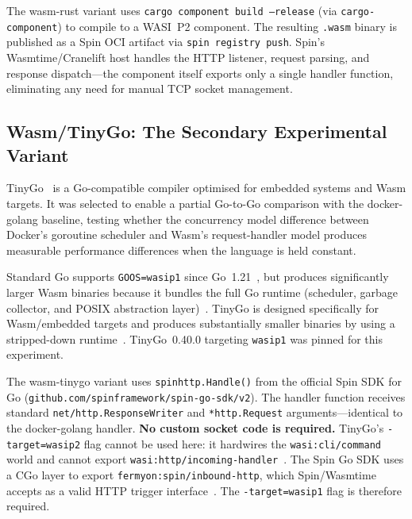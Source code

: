 \begin{sloppypar}
The wasm-rust variant uses \texttt{cargo component build --release} (via \texttt{cargo-component}) to compile to a \acs{WASI}~P2 component. The resulting \texttt{.wasm} binary is published as a Spin \acs{OCI} artifact via \texttt{spin registry push}. Spin's Wasmtime/Cranelift host handles the \acs{HTTP} listener, request parsing, and response dispatch---the component itself exports only a single handler function, eliminating any need for manual \acs{TCP} socket management.
\end{sloppypar}

\subsection{Wasm/TinyGo: The Secondary Experimental Variant}

TinyGo~\cite{tinygo2024} is a Go-compatible compiler optimised for embedded systems and \acs{Wasm} targets. It was selected to enable a partial Go-to-Go comparison with the docker-golang baseline, testing whether the concurrency model difference between Docker's goroutine scheduler and \acs{Wasm}'s request-handler model produces measurable performance differences when the language is held constant.

\begin{sloppypar}
Standard Go supports \texttt{GOOS=wasip1} since Go~1.21~\cite{goblogwasi2024}, but produces significantly larger \acs{Wasm} binaries because it bundles the full Go runtime (scheduler, garbage collector, and \acs{POSIX} abstraction layer)~\cite{goblogwasi2024}. TinyGo is designed specifically for \acs{Wasm}/embedded targets and produces substantially smaller binaries by using a stripped-down runtime~\cite{tinygo2024}. TinyGo~0.40.0 targeting \texttt{wasip1} was pinned for this experiment.
\end{sloppypar}

\begin{sloppypar}
The wasm-tinygo variant uses \texttt{spinhttp.Handle()} from the official Spin \acs{SDK} for Go (\texttt{github.com/spinframework/spin-go-sdk/v2}). The handler function receives standard \texttt{net/http.ResponseWriter} and \texttt{*http.Request} arguments---identical to the docker-golang handler. \textbf{No custom socket code is required.} TinyGo's \texttt{-target=wasip2} flag cannot be used here: it hardwires the \texttt{wasi:cli/command} world and cannot export \texttt{wasi:http/incoming-handler}~\cite{tinygo2024, bytecodealliance2024componentmodel}. The Spin Go \acs{SDK} uses a \acs{CGo} layer to export \texttt{fermyon:spin/inbound-http}, which Spin/Wasmtime accepts as a valid \acs{HTTP} trigger interface~\cite{spinframework2024go}. The \texttt{-target=wasip1} flag is therefore required.
\end{sloppypar}

